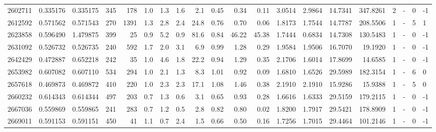 \begin{tabular}{rrrrrrrrrrrrrrrrrlrl}
   2602711 & 0.335176 &   0.335175 &  345 &  178 &      1.0 &      1.3 &     1.6 &      2.1 &       0.45 &        0.34 &        0.11 &  3.0514 &  2.9864 &   14.7341 &  347.8261 &       2 &             - &        0 &        -1 \\
   2612592 & 0.571562 &   0.571543 &  270 & 1391 &      1.3 &      2.8 &     2.4 &     24.8 &       0.76 &        0.70 &        0.06 &  1.8173 &  1.7544 &   14.7787 &  208.5506 &       1 &             - &        5 &         1 \\
   2623858 & 0.596490 &   1.479875 &  399 &   25 &      0.9 &      5.2 &     0.9 &     81.6 &       0.84 &       46.22 &       45.38 &  1.7444 &  0.6834 &   14.7308 &  130.5483 &       1 &             - &        0 &        -1 \\
   2631092 & 0.526732 &   0.526735 &  240 &  592 &      1.7 &      2.0 &     3.1 &      6.9 &       0.99 &        1.28 &        0.29 &  1.9584 &  1.9506 &   16.7070 &   19.1920 &       1 &             - &        0 &        -1 \\
   2642429 & 0.472887 &   0.652218 &  242 &   35 &      1.0 &      4.6 &     1.8 &     22.2 &       0.94 &        1.29 &        0.35 &  2.1706 &  1.6014 &   17.8699 &   14.6585 &       1 &             - &        0 &        -1 \\
   2653982 & 0.607082 &   0.607110 &  534 &  294 &      1.0 &      2.1 &     1.3 &      8.3 &       1.01 &        0.92 &        0.09 &  1.6810 &  1.6526 &   29.5989 &  182.3154 &       1 &             - &        6 &         0 \\
   2657618 & 0.469873 &   0.469872 &  410 &  220 &      1.0 &      2.3 &     2.3 &     17.1 &       1.08 &        1.46 &        0.38 &  2.1910 &  2.1910 &   15.9286 &   15.9388 &       1 &             - &        5 &         0 \\
   2660232 & 0.614343 &   0.614344 &  497 &  203 &      0.7 &      1.3 &     0.6 &      3.1 &       0.65 &        0.93 &        0.28 &  1.6616 &  1.6333 &   29.5159 &  179.2115 &       1 &             - &        0 &        -1 \\
   2667036 & 0.559869 &   0.559865 &  241 &  283 &      0.7 &      1.2 &     0.5 &      2.8 &       0.82 &        0.80 &        0.02 &  1.8200 &  1.7917 &   29.5421 &  178.8909 &       1 &             - &        0 &        -1 \\
   2669011 & 0.591153 &   0.591151 &  450 &   41 &      1.1 &      0.7 &     2.4 &      1.5 &       0.66 &        0.50 &        0.16 &  1.7256 &  1.7015 &   29.4464 &  101.2146 &       1 &             - &        0 &        -1 \\

\end{tabular}
